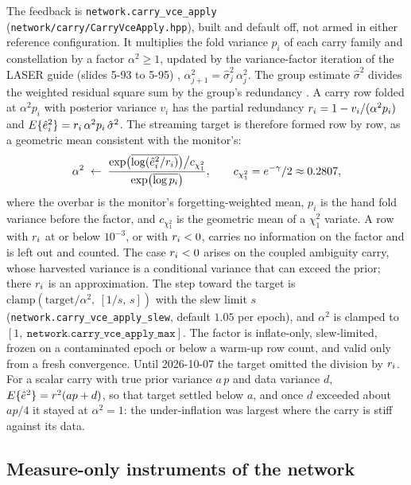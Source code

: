 \documentclass[main.tex]{subfiles}
\begin{document}
The feedback is \texttt{network.carry\_vce\_apply}
(\texttt{network/carry/CarryVceApply.hpp}), built and default off, not armed in
either reference configuration.  It
multiplies the fold variance $p_i$ of each carry family and
constellation by a factor $\alpha^2 \ge 1$, updated by the
variance-factor iteration of the LASER guide (slides 5-93 to 5-95)
\cite{snow2024laser}, $\alpha^2_{j+1} = \hat\sigma^2_j\,\alpha^2_j$.
The group estimate $\hat\sigma^2$ divides the weighted residual square
sum by the group's redundancy \cite{snow2026adjustment}.  A carry row
folded at $\alpha^2 p_i$ with posterior variance $v_i$ has the partial
redundancy $r_i = 1 - v_i/(\alpha^2 p_i)$ and
$E\{\hat e_i^2\} = r_i\,\alpha^2 p_i\,\hat\sigma^2$.  The streaming
target is therefore formed row by row, as a geometric mean consistent
with the monitor's:
\begin{equation}
\alpha^2 \;\leftarrow\;
  \frac{\exp\bigl(\overline{\log(\hat e_i^2/r_i)}\bigr)\big/c_{\chi^2_1}}
       {\exp\bigl(\overline{\log p_i}\bigr)} ,
\qquad c_{\chi^2_1} = e^{-\gamma}/2 \approx 0.2807 ,
\label{eq:qc-carry-vce-target}
\end{equation}
where the overbar is the monitor's forgetting-weighted mean, $p_i$ is
the hand fold variance before the factor, and $c_{\chi^2_1}$ is the
geometric mean of a $\chi^2_1$ variate.  A row with $r_i$ at or
below $10^{-3}$, or with $r_i < 0$, carries no information on the
factor and is left out and counted.  The case $r_i < 0$ arises on
the coupled ambiguity carry, whose harvested variance is a conditional
variance that can exceed the prior; there $r_i$ is an
approximation.  The step toward the target is
$\mathrm{clamp}(\text{target}/\alpha^2,\ [1/s,\,s])$ with the slew limit $s$
(\texttt{network.carry\_vce\_apply\_slew}, default $1.05$ per epoch), and
$\alpha^2$ is clamped to $[1,\ \texttt{network.carry\_vce\_apply\_max}]$.  The
factor is inflate-only, slew-limited, frozen on a
contaminated epoch or below a warm-up row count, and valid only from a fresh
convergence.  Until
2026-10-07 the target omitted the division by $r_i$.  For a scalar
carry with true prior variance $a\,p$ and data variance $d$,
$E\{\hat e^2\} = r^2(a p + d)$, so that target settled below $a$,
and once $d$ exceeded about $a p/4$ it stayed at $\alpha^2 = 1$: the
under-inflation was largest where the carry is stiff against its data.

\subsection{Measure-only instruments of the network}\label{sec:stoch-instruments}
\end{document}
